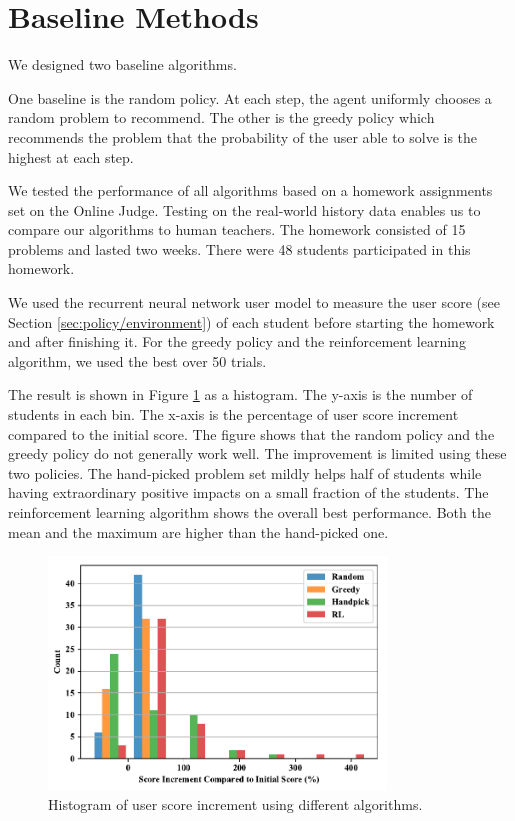 \section{Baseline Methods}

    We designed two baseline algorithms.

    One baseline is the random policy.
    At each step, the agent uniformly chooses a random problem to recommend.
    The other is the greedy policy which recommends the problem that
    the probability of the user able to solve is the highest at each step.

    We tested the performance of all algorithms based on a homework assignments set on the Online Judge.
    Testing on the real-world history data enables us to compare our algorithms to human teachers.
    The homework consisted of 15 problems and lasted two weeks.
    There were 48 students participated in this homework.

    We used the recurrent neural network user model to measure the user score (see Section \ref{sec:policy/environment})
    of each student before starting the homework and after finishing it.
    For the greedy policy and the reinforcement learning algorithm,
    we used the best over 50 trials.

    The result is shown in Figure \ref{fig:policy-hist} as a histogram.
    The y-axis is the number of students in each bin.
    The x-axis is the percentage of user score increment compared to the initial score.
    The figure shows that the random policy and the greedy policy do not generally work well.
    The improvement is limited using these two policies.
    The hand-picked problem set mildly helps half of students
    while having extraordinary positive impacts on a small fraction of the students.
    The reinforcement learning algorithm shows the overall best performance.
    Both the mean and the maximum are higher than the hand-picked one.

    \begin{figure}[htp]
        \centering
        \includegraphics[width=0.8\textwidth]{img/policy-hist.pdf}
        \caption{Histogram of user score increment using different algorithms.}
        \label{fig:policy-hist}
    \end{figure}









